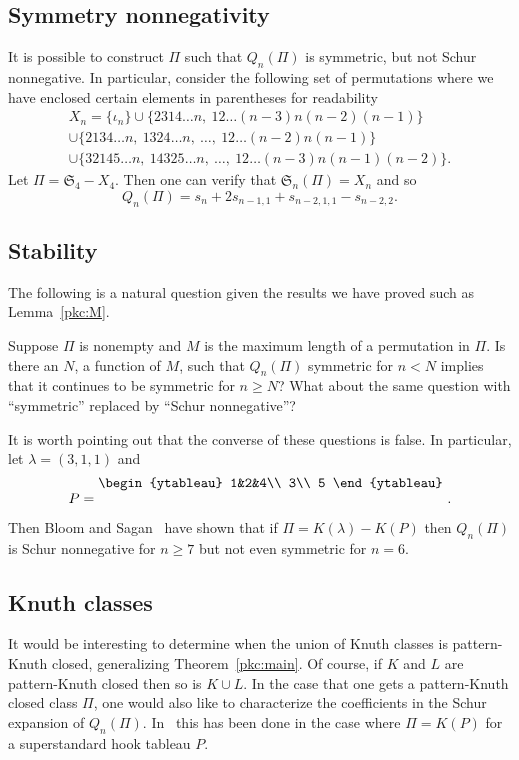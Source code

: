 \documentclass[ALCO,ThmDefs,Unicode,epreuves]{cedram}
\newcommand{\io}{\iota}
\newcommand{\la}{\lambda}
\newcommand{\fS}{{\mathfrak S}}
\begin{document}
\subsection*{Symmetry \vs nonnegativity}
It is possible to construct $\Pi$ such that $Q_n(\Pi)$ is symmetric, but not Schur nonnegative. In particular, consider the following set of permutations where we have enclosed certain elements in parentheses for readability
\begin{multline*}
X_n=\{\io_n\} \cup \{2314\dots n,\ 12\dots(n-3)n(n-2)(n-1)\}\\%
\cup\{2134\dots n,\ 1324\dots n,\ \dots,\ 12\dots (n-2)n(n-1)\}\\%
\cup \{32145\dots n,\ 14325\dots n,\ \dots,\ 12\dots (n-3)n(n-1)(n-2)\}.
\end{multline*}
Let $\Pi = \fS_4-X_4$. Then one can verify that $\fS_n(\Pi)=X_n$ and so
\[
Q_n(\Pi)= s_n+2s_{n-1,1} + s_{n-2,1,1}-s_{n-2,2}.
\]




\subsection*{Stability}
The following is a natural question given the results we have proved such as Lemma~\ref{pkc:M}.
\begin{question}
Suppose $\Pi$ is nonempty and $M$ is the maximum length of a permutation in $\Pi$. Is there an $N$, a function of $M$, such that $Q_n(\Pi)$ symmetric for $n<N$ implies that it continues to be symmetric for $n\ge N$? What about the same question with ``symmetric'' replaced by ``Schur nonnegative''?
\end{question}

It is worth pointing out that the converse of these questions is false. In particular, let $\la=(3,1,1)$ and 
\[
P=\raisebox{4mm}{\begin{ytableau}
1&2&4\\
3\\
5
\end{ytableau}}\ .
\]
Then Bloom and Sagan~\cite{ajout} have shown that if $\Pi=K(\la)-K(P)$ then $Q_n(\Pi)$ is Schur nonnegative for $n\ge7$ but not even symmetric for $n=6$.


\subsection*{Knuth classes}
It would be interesting to determine when the union of Knuth classes is pattern-Knuth closed, generalizing Theorem~\ref{pkc:main}. Of course, if $K$ and $L$ are pattern-Knuth closed then so is $K\cup L$. In the case that one gets a pattern-Knuth closed class $\Pi$, one would also like to characterize the coefficients in the Schur expansion of $Q_n(\Pi)$. 
In~\cite{ajout} this has been done in the case where $\Pi=K(P)$ for a superstandard hook tableau $P$.
\end{document}

